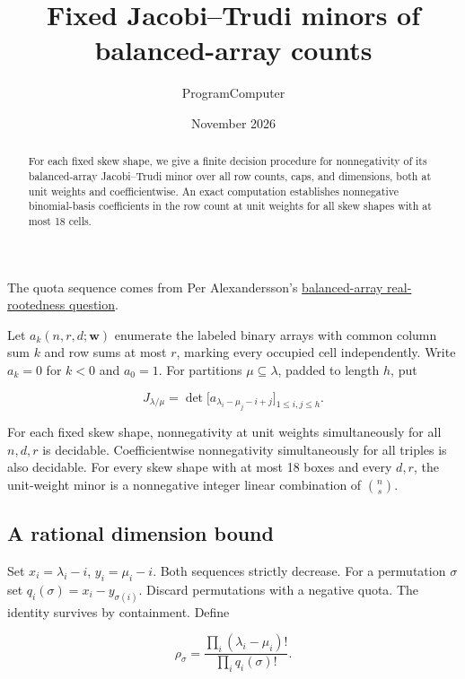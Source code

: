 \documentclass[11pt]{article}
\title{Fixed Jacobi--Trudi minors of balanced-array counts}
\author{ProgramComputer}
\date{November 2026}
\begin{document}
\maketitle
\begin{abstract}
For each fixed skew shape, we give a finite decision procedure for nonnegativity of its balanced-array Jacobi--Trudi minor over all row counts, caps, and dimensions, both at unit weights and coefficientwise. An exact computation establishes nonnegative binomial-basis coefficients in the row count at unit weights for all skew shapes with at most 18 cells.
\end{abstract}

\noindent The quota sequence comes from Per Alexandersson's
\href{https://www.symmetricfunctions.com/realRootedOpenProblems.htm}{balanced-array real-rootedness question}.

Let $a_k(n,r,d;\mathbf w)$ enumerate the labeled binary arrays with common column sum $k$ and row sums at most $r$, marking every occupied cell independently. Write $a_k=0$ for $k<0$ and $a_0=1$. For partitions $\mu\subseteq\lambda$, padded to length $h$, put

\begin{equation*}
J_{\lambda/\mu}=\det\big[a_{\lambda_i-\mu_j-i+j}\big]_{1\le i,j\le h}.
\end{equation*}

For each fixed skew shape, nonnegativity at unit weights simultaneously for all $n,d,r$ is decidable. Coefficientwise nonnegativity simultaneously for all triples is also decidable. For every skew shape with at most 18 boxes and every $d,r$, the unit-weight minor is a nonnegative integer linear combination of $\binom ns$.

\subsection{A rational dimension bound}

Set $x_i=\lambda_i-i$, $y_i=\mu_i-i$. Both sequences strictly decrease. For a permutation $\sigma$ set $q_i(\sigma)=x_i-y_{\sigma(i)}$. Discard permutations with a negative quota. The identity survives by containment. Define

\begin{equation*}
\rho_\sigma=\frac{\prod_i(\lambda_i-\mu_i)!}{\prod_i q_i(\sigma)!}.
\end{equation*}
\end{document}

